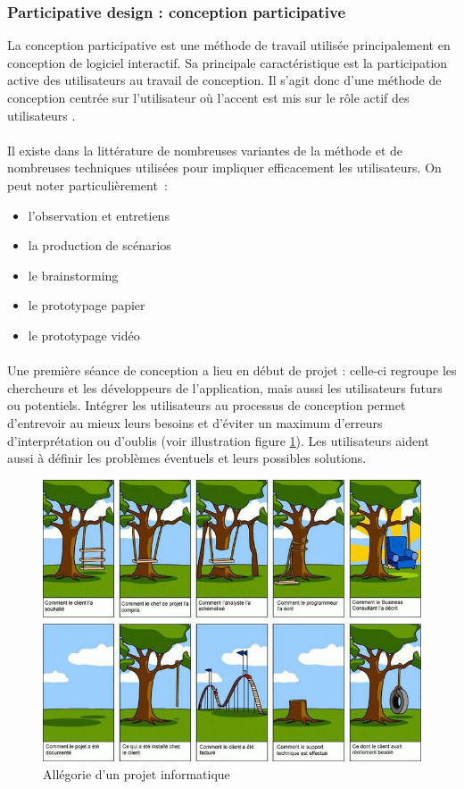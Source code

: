 	\subsubsection*{Participative design : conception participative}
La conception participative est une méthode de travail utilisée principalement en conception de logiciel interactif. Sa principale caractéristique est la participation active des utilisateurs au travail de conception. Il s'agit donc d'une méthode de conception centrée sur l'utilisateur où l'accent est mis sur le rôle actif des utilisateurs \cite{wiki:cp}.

\paragraph{}
Il existe dans la littérature de nombreuses variantes de la méthode et de nombreuses techniques utilisées pour impliquer efficacement les utilisateurs. On peut noter particulièrement~:
\begin{itemize}
    \item l'observation et entretiens
    \item la production de scénarios
    \item le brainstorming
    \item le prototypage papier
    \item le prototypage vidéo
\end{itemize}

\paragraph{}
Une première séance de conception a lieu en début de projet : celle-ci regroupe les chercheurs et les développeurs de l'application, mais aussi les utilisateurs futurs ou potentiels. Intégrer les utilisateurs au processus de conception permet d'entrevoir au mieux leurs besoins et d'éviter un maximum d'erreurs d'interprétation ou d'oublis (voir illustration figure \ref{projet_info}). Les utilisateurs aident aussi à définir les problèmes éventuels et leurs possibles solutions.
\begin{figure}
	\centering
	\includegraphics[width=16cm]{images/projet_info.jpg}
	\caption{Allégorie d'un projet informatique}
	\label{projet_info}
\end{figure}

